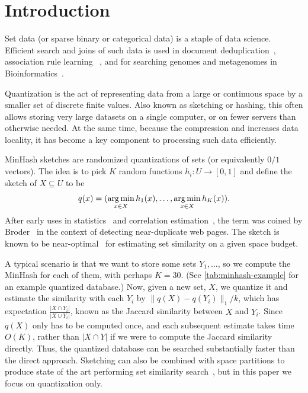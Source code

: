 
\section{Introduction}
Set data (or sparse binary or categorical data) is a staple of data science.
Efficient search and joins of such data is used in document deduplication~\cite{broder1997syntactic}, association rule learning ~\cite{zheng2001real}, and 
for searching genomes and metagenomes in Bioinformatics~\cite{ondov2016mash}.

Quantization is the act of representing data from a large or continuous space by a smaller set of discrete finite values.
Also known as sketching or hashing, this often allows storing very large datasets on a single computer, or on fewer servers than otherwise needed.
At the same time, because the compression and increases data locality, it has become a key component to processing such data efficiently.


MinHash sketches are randomized quantizations of sets (or equivalently $0/1$ vectors).
The idea is to pick $K$ random functions $h_i : U \to [0,1]$ and define the sketch of $X\subseteq U$ to be
\[q(x) = (\operatorname*{arg\,min}_{x\in X}h_1(x), \dots, \operatorname*{arg\,min}_{x\in X}h_K(x)).\]
After early uses in statistics~\cite{brewer1972selecting} and correlation estimation~\cite{flajolet1985probabilistic}, the term was coined by Broder~\cite{broder1997resemblance, broder1997syntactic} in the context of detecting near-duplicate web pages.
The sketch is known to be near-optimal~\cite{pagh2014min} for estimating set similarity on a given space budget.

A typical scenario is that we want to store some sets $Y_1, \dots$, so we compute the MinHash for each of them, with perhaps $K=30$.
(See \cref{tab:minhash-example} for an example quantized database.)
Now, given a new set, $X$, we quantize it and estimate the similarity with each $Y_i$ by $\|q(X)-q(Y_i)\|_1/k$, which has expectation $\frac{|X\cap Y_i|}{|X\cup Y_i|}$, known as the Jaccard similarity between $X$ and $Y_i$.
Since $q(X)$ only has to be computed once, and each subsequent estimate takes time $O(K)$, rather than $|X \cap Y|$ if we were to compute the Jaccard similarity directly.
Thus, the quantized database can be searched substantially faster than the direct approach.
Sketching can also be combined with space partitions to produce state of the art performing set similarity search~\cite{christiani2018scalable}, but in this paper we focus on quantization only.

